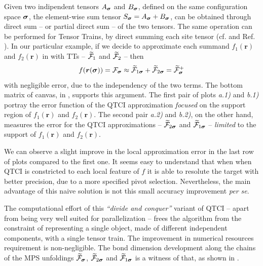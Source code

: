 Given two indipendent tensors $A_{\boldsymbol{\sigma}}$ and 
$B_{\boldsymbol{\sigma}}$, defined on the same configuration space $\boldsymbol{\sigma}$, the element-wise sum tensor $S_{\boldsymbol{\sigma}} = A_{\boldsymbol{\sigma}} + B_{\boldsymbol{\sigma}}$, can be obtained through direct sum -- or partial direct sum -- of the two tensors. The same operation can be performed for Tensor Trains, by direct summing each site tensor (cf.  and Ref. \cite{Lee2018}). 
In our particular example, if we decide to approximate each summand $f_1(\boldsymbol{r})$ and $f_2(\boldsymbol{r})$ in  with TTs -- $\widetilde{\mathcal{F}}_1$ and $\widetilde{\mathcal{F}}_2$ -- then 
\begin{equation}
	f(\boldsymbol{r}(\boldsymbol{\sigma})) = \mathcal{F}_{\boldsymbol{\sigma}} \approx \widetilde{\mathcal{F}}_{1\boldsymbol{\sigma}} + \widetilde{\mathcal{F}}_{2\boldsymbol{\sigma}} = \widetilde{\mathcal{F}}^+_{\boldsymbol{\sigma}}
	\label{eq:localTermsSum}
\end{equation}
with negligible error, due to the independency of the two terms. The bottom matrix of canvas, in , supports this argument. The first pair of plots \textit{a.1)} and \textit{b.1)} portray the error function of the QTCI approximation \textit{focused} on the support region of $f_1(\boldsymbol{r})$ and $f_2(\boldsymbol{r})$. The second pair \textit{a.2)} and \textit{b.2)}, on the other hand, measures the error for the QTCI approximations -- $\widetilde{\mathcal{F}}_{2\boldsymbol{\sigma}}$ and $\widetilde{\mathcal{F}}_{1\boldsymbol{\sigma}}$ -- \textit{limited} \footnotemark to the support of $f_1(\boldsymbol{r})$ and $f_2(\boldsymbol{r})$.




We can observe a slight improve in the local approximation error in the last row of plots compared to the first one. It seems easy to understand that when when QTCI is constricted to each local feature of $f$ it is able to resolute the target with better precision, due to a more specified pivot selection. Nevertheless, the main advantage of this naive solution is not this small accuracy improvement \textit{per se}. 

The computational effort of this \textit{``divide and conquer''} variant of QTCI -- apart from being very well suited for parallelization -- frees the algorithm from the constraint of representing a single object, made of different independent components, with a single tensor train. The improvement in numerical resources requirement is non-negligible. The bond dimension development along the chains of the MPS unfoldings $\widetilde{\mathcal{F}}_{\boldsymbol{\sigma}}$, $\widetilde{\mathcal{F}}_{2\boldsymbol{\sigma}}$ and $\widetilde{\mathcal{F}}_{1\boldsymbol{\sigma}}$ is a witness of that, as shown in . 

